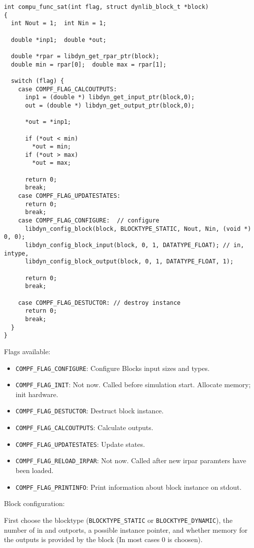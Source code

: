 \documentclass[%
	pdftex,%
	a4paper,%
	oneside,%
	11pt,%
	halfparskip,%
	headsepline,%
	bibtotocnumbered,%
	idxtotoc%
]{scrartcl}
\begin{document}
\begin{verbatim}
int compu_func_sat(int flag, struct dynlib_block_t *block)
{
  int Nout = 1;  int Nin = 1;

  double *inp1;  double *out;	

  double *rpar = libdyn_get_rpar_ptr(block);
  double min = rpar[0];  double max = rpar[1];

  switch (flag) {
    case COMPF_FLAG_CALCOUTPUTS:
      inp1 = (double *) libdyn_get_input_ptr(block,0);
      out = (double *) libdyn_get_output_ptr(block,0);
      
      *out = *inp1;
      
      if (*out < min)
        *out = min;
      if (*out > max)
        *out = max;
      
      return 0;
      break;
    case COMPF_FLAG_UPDATESTATES:
      return 0;
      break;
    case COMPF_FLAG_CONFIGURE:  // configure
      libdyn_config_block(block, BLOCKTYPE_STATIC, Nout, Nin, (void *) 0, 0); 
      libdyn_config_block_input(block, 0, 1, DATATYPE_FLOAT); // in, intype, 
      libdyn_config_block_output(block, 0, 1, DATATYPE_FLOAT, 1);

      return 0;
      break;

    case COMPF_FLAG_DESTUCTOR: // destroy instance
      return 0;
      break;
  }
}
\end{verbatim}


Flags available:

\begin{itemize}
 \item \texttt{COMPF\_FLAG\_CONFIGURE}: Configure Blocks input sizes and types.
 \item \texttt{COMPF\_FLAG\_INIT}: Not now. Called before simulation start. Allocate memory; init hardware.
 \item \texttt{COMPF\_FLAG\_DESTUCTOR}: Destruct block instance.
 \item \texttt{COMPF\_FLAG\_CALCOUTPUTS}: Calculate outputs.
 \item \texttt{COMPF\_FLAG\_UPDATESTATES}: Update states.
 \item \texttt{COMPF\_FLAG\_RELOAD\_IRPAR}: Not now. Called after new irpar paramters have been loaded.
 \item \texttt{COMPF\_FLAG\_PRINTINFO}: Print information about block instance on stdout.
\end{itemize}

Block configuration:

First choose the blocktype (\texttt{BLOCKTYPE\_STATIC} or \texttt{BLOCKTYPE\_DYNAMIC}), the number of in and outports, a possible instance pointer, and whether memory for the outputs is provided by the block (In most cases 0 is choosen). 
\end{document}
